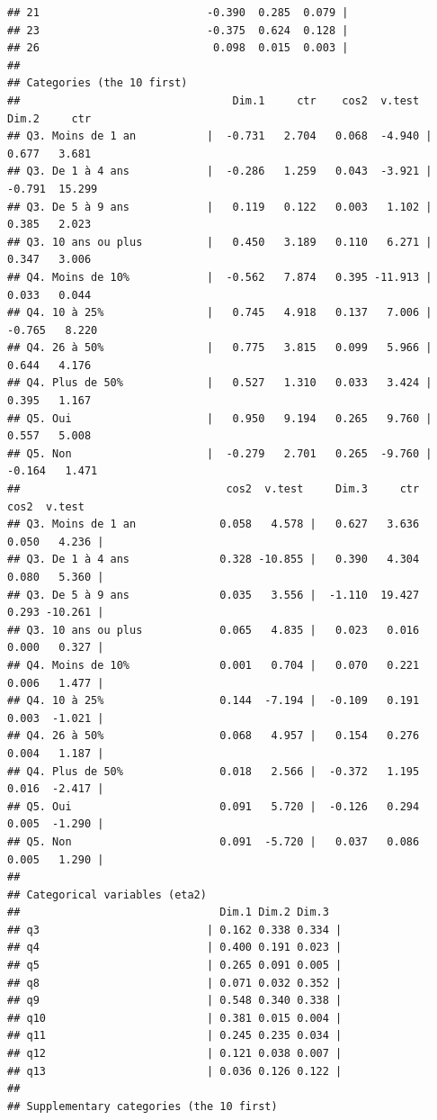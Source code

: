 \documentclass[
  11pt,
  french,
]{book}
\begin{document}
\begin{verbatim}
## 21                          -0.390  0.285  0.079 |
## 23                          -0.375  0.624  0.128 |
## 26                           0.098  0.015  0.003 |
## 
## Categories (the 10 first)
##                                 Dim.1     ctr    cos2  v.test     Dim.2     ctr
## Q3. Moins de 1 an           |  -0.731   2.704   0.068  -4.940 |   0.677   3.681
## Q3. De 1 à 4 ans            |  -0.286   1.259   0.043  -3.921 |  -0.791  15.299
## Q3. De 5 à 9 ans            |   0.119   0.122   0.003   1.102 |   0.385   2.023
## Q3. 10 ans ou plus          |   0.450   3.189   0.110   6.271 |   0.347   3.006
## Q4. Moins de 10%            |  -0.562   7.874   0.395 -11.913 |   0.033   0.044
## Q4. 10 à 25%                |   0.745   4.918   0.137   7.006 |  -0.765   8.220
## Q4. 26 à 50%                |   0.775   3.815   0.099   5.966 |   0.644   4.176
## Q4. Plus de 50%             |   0.527   1.310   0.033   3.424 |   0.395   1.167
## Q5. Oui                     |   0.950   9.194   0.265   9.760 |   0.557   5.008
## Q5. Non                     |  -0.279   2.701   0.265  -9.760 |  -0.164   1.471
##                                cos2  v.test     Dim.3     ctr    cos2  v.test  
## Q3. Moins de 1 an             0.058   4.578 |   0.627   3.636   0.050   4.236 |
## Q3. De 1 à 4 ans              0.328 -10.855 |   0.390   4.304   0.080   5.360 |
## Q3. De 5 à 9 ans              0.035   3.556 |  -1.110  19.427   0.293 -10.261 |
## Q3. 10 ans ou plus            0.065   4.835 |   0.023   0.016   0.000   0.327 |
## Q4. Moins de 10%              0.001   0.704 |   0.070   0.221   0.006   1.477 |
## Q4. 10 à 25%                  0.144  -7.194 |  -0.109   0.191   0.003  -1.021 |
## Q4. 26 à 50%                  0.068   4.957 |   0.154   0.276   0.004   1.187 |
## Q4. Plus de 50%               0.018   2.566 |  -0.372   1.195   0.016  -2.417 |
## Q5. Oui                       0.091   5.720 |  -0.126   0.294   0.005  -1.290 |
## Q5. Non                       0.091  -5.720 |   0.037   0.086   0.005   1.290 |
## 
## Categorical variables (eta2)
##                               Dim.1 Dim.2 Dim.3  
## q3                          | 0.162 0.338 0.334 |
## q4                          | 0.400 0.191 0.023 |
## q5                          | 0.265 0.091 0.005 |
## q8                          | 0.071 0.032 0.352 |
## q9                          | 0.548 0.340 0.338 |
## q10                         | 0.381 0.015 0.004 |
## q11                         | 0.245 0.235 0.034 |
## q12                         | 0.121 0.038 0.007 |
## q13                         | 0.036 0.126 0.122 |
## 
## Supplementary categories (the 10 first)

\end{verbatim}
\end{document}
